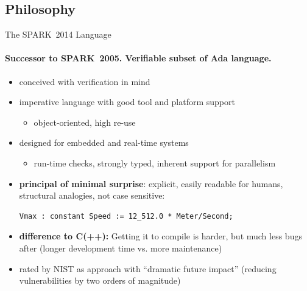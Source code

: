 \subsection*{Philosophy}
\begin{frame}[fragile]{The SPARK~2014 Language}
  \framesubtitle{Successor to SPARK~2005. Verifiable subset of Ada language.}
  \begin{itemize}
  \item conceived with verification in mind
  \item imperative language with good tool and platform support
    \begin{itemize}
    \item object-oriented, high re-use
    \end{itemize}
  \item designed for embedded and real-time systems
    \begin{itemize}
    \item run-time checks, strongly typed, inherent support for parallelism
    \end{itemize}

  \item \textbf{principal of minimal surprise}: explicit, easily readable for humans, structural analogies, not case sensitive:
\begin{lstlisting}
Vmax : constant Speed := 12_512.0 * Meter/Second;
\end{lstlisting}

  \item \textbf{difference to C(++):} Getting it to compile is harder, but much less bugs after (longer development time vs. more maintenance)

  \item rated by NIST as approach with ``dramatic future impact'' (reducing
    vulnerabilities by two orders of magnitude)
  \end{itemize}
\end{frame}
\addtocounter{clock}{2}



